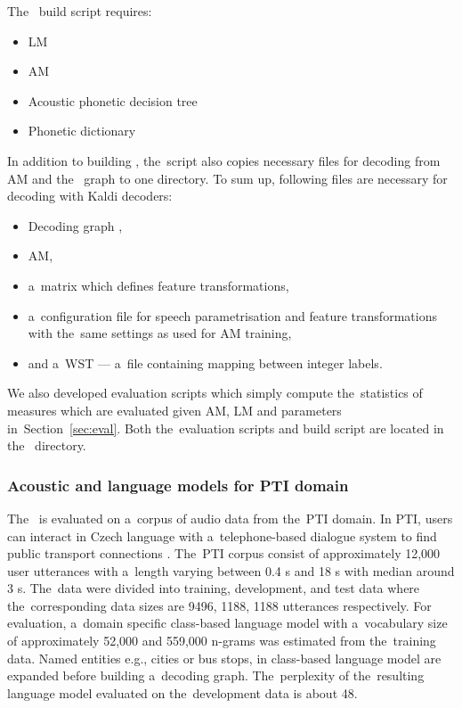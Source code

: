 The~ build script requires:
\begin{itemize}
    \item \acl{LM}
    \item \acl{AM}
    \item Acoustic phonetic decision tree
    \item Phonetic dictionary
\end{itemize}

In addition to building , the~script also copies necessary files for decoding from \ac{AM} and the~ graph to one directory.
To sum up, following files are necessary for decoding with Kaldi decoders:
\begin{itemize}
    \item Decoding graph ,
    \item \acl{AM},
    \item a~matrix which defines feature transformations,
    \item a~configuration file for speech parametrisation and feature transformations with the~same settings as used for \ac{AM} training,
    \item and a~\acf{WST} --- a~file containing mapping between integer labels.
\end{itemize}

We also developed evaluation scripts which simply compute the~statistics of measures which are evaluated given \ac{AM}, \ac{LM} and parameters in~Section~\ref{sec:eval}.
Both the~evaluation scripts and build  script are located in the~ directory.

\subsubsection*{Acoustic and language models for \acs{PTI} domain}
\label{sec:ptilm}
The~ is evaluated on a~corpus of audio data from the~\acf{PTI} domain.
In PTI, users can interact in Czech language with a~telephone-based dialogue system to find public transport connections \cite{ptics2014url}.
The~PTI corpus consist of approximately 12,000 user utterances with a~length varying between 0.4 s and 18 s with median around 3 s.
The~data were divided into training, development, and test data where the~corresponding data sizes are 9496, 1188, 1188 utterances respectively.
For evaluation, a~domain specific class-based language model with a~vocabulary size of approximately 52,000  and 559,000 n-grams was estimated from the~training data.
Named entities e.g., cities or bus stops, in class-based language model are expanded before building a~decoding graph.
The~perplexity of the~resulting language model evaluated on the~development data is about 48.


